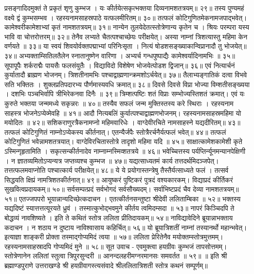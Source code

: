 प्रसङ्गादिदमुक्तं ते प्रकृतं शृणु कुम्भज ।
यः कीर्तयेत्सकृत्भक्तया दिव्यनामशतत्रयम्॥ २९॥
तस्य पुण्यमहं वक्ष्ये द्वं कुम्भसम्भव ।
रहस्यनामसाहस्रपाठे यत्फलमीरितम्॥ ३०॥
तत्फलं कोटिगुणितमेकनामजपाद्भवेत्।
कामेश्वरीकामेशाभ्यां कृतं नामशतत्रयम्॥ ३१॥
नान्येन तुलयेदेतत्स्तोत्रेणान्य कृतेन च ।
श्रियः परम्परा यस्य भावि वा चोत्तरोत्तरम्॥ ३२॥
तेनैव लभ्यते चैतत्पश्चाच्छेयः परीक्षयेत्।
अस्या नाम्नां त्रिशत्यास्तु महिमा केन वर्णयते ॥ ३३॥
या स्वयं शिवयोर्वक्तपद्माभ्यां परिनिःसृता ।
नित्यं षोडशसङ्ख्याकान्विप्रानादौ तु भोजयेत्॥ ३४॥
अभ्यक्ताम्सितिलतैलेन स्नातानुष्णेन वारिणा ।
अभ्यर्च गन्धपुष्पाद्यैः कामेश्वर्यादिनामभिः ॥ ३५॥
सूपापूपैः शर्कराद्मैः पायसैः फलसंयुतैः ।
विद्याविदो विशेषेण भोजयेत्पोडश द्विजान्॥ ३६॥
एवं नित्यार्चनं कुर्यातादौ ब्राह्मण भोजनम्।
त्रिशतीनामभिः पश्चाद्वाह्मणान्क्रमशोऽर्चयेत्॥ ३७॥
तैलाभ्यङ्गातिकं दत्वा विभवे सति भक्तितः ।
शुक्लप्रतिपदारभ्य पौर्णमास्यवधि क्रमात्॥ ३८॥
दिवसे दिवसे विप्रा भोज्या विम्शतीसङ्ख्यया ।
दशभिः पञ्चभिर्वापि त्रीभिरेकनवा दिनैः ॥ ३९॥
त्रिम्शत्पष्टिः शतं विप्राः सम्भोज्यस्तिशतं क्रमात्।
एवं यः कुरुते भक्तया जन्ममध्ये सकृन्नरः ॥ ४०॥
तस्यैव सफलं जन्म मुक्तिस्तस्य करे स्थिराः ।
रहस्यनाम साहस्त्र भोजनेऽप्येव्मेवहि ॥ ४१॥
आदौ नित्यबलिं कुर्यात्पश्चाद्वाह्मणभोजनम्।
रहस्यनामसाहस्रमहिमा यो मयोदितः ॥ ४२॥
सशिकराणुरत्रैकनामप्नो महिमवारिधेः ।
वाग्देवीरचिते नामसाहस्ने यद्यदीरितम्॥ ४३॥
तत्फलं कोटिगुणितं नाम्नोऽप्येकस्य कीर्तनात्।
एतन्यैर्जपैः स्तोत्रैरर्चनैर्यत्फलं भवेत्॥ ४४॥
तत्फलं कोटिगुणितं भवेन्नामशतत्रयात्।
वाग्देविरचितास्तोत्रे तादृशो महिमा यदि ॥ ४५॥
साक्षात्कामेशकामेशी कृते ऽस्मिन्गृहृतामिति ।
सकृत्सन्कीर्तनादेव नाम्नाम्नस्मिव्शतत्रये ॥ ४६॥
भवेच्चित्तस्य पर्यप्तिर्न्यूनमन्यानपेक्षिणी ।
न ज्ञातव्यमितोऽप्यन्यत्र जप्तव्यश्च कुम्भज ॥ ४७॥
यद्यत्साध्यतमं कार्य तत्तदर्थमिदञ्जपेत्।
तत्तत्फलमवाप्नोति पश्चात्कार्य परीक्षयेत्॥ ४८॥
ये ये प्रयोगास्तन्त्रेषु तैस्तैर्यत्साध्यते फलं ।
तत्सर्व सिद्धयति क्षिप्रं नामत्रिशतकीर्तनात्॥ ४९॥
आयुष्करं पुष्टिकरं पुत्रदं वश्यकारकम्।
विद्याप्रदं कीर्तिकरं सुखवित्वप्रदायकम्॥ ५०॥
सर्वसम्पत्प्रदं सर्वभोगदं सर्वसौख्यदम्।
सर्वाभिष्टप्रदं चैव देव्या नामशतत्रयम्॥ ५१॥
एतज्जपपरो भूयान्नान्यदिच्छेत्कदाचन ।
एतत्कीर्तनसन्तुष्टा श्रीदेवी ललिताम्बिका ॥ ५२॥
भक्तस्य यद्यदिष्टं स्यात्तत्तत्यूरयते ध्रुवं ।
तस्मात्कुभोद्भवमुने कीर्तय त्वमिदम्सदा ॥ ५३॥
नापरं किञ्चिदपि ते बोद्धव्यं नावशिष्यते ।
इति ते कथितं स्तोत्र ललिता प्रीतिदायकम्॥ ५४॥
नाविद्यावेदिने ब्रूयान्नाभक्ताय कदाचन ।
न शठाय न दुष्टाय नाविश्वासाय कहिर्चित्॥ ५६॥
यो ब्रूयात्रिशतीं नाम्नां तस्यानर्थो महान्भवेत्।
इत्याज्ञा शाङ्करी प्रोक्ता तस्माद्गोप्यमिदं त्वया ॥ ५७॥
ललिता प्रेरितेनैव मयोक्तम्स्तोत्रमुत्तमम्।
रहस्यनामसाहस्रादपि गोप्यमिदं मुने ॥ ५८॥
सूत उवाच -
एवमुक्त्वा हयग्रीवः कुम्भजं तापसोत्तमम्।
स्तोत्रेणानेन ललितां स्तुत्वा त्रिपुरसुन्दरी ॥
आनन्दलहरीमग्नरमानसः समवर्तत ॥ ५९॥
॥ इति श्री ब्रह्माण्डपुराणे उत्तराखण्डे
श्री हयग्रीवागस्त्यसंवादे
श्रीललितात्रिशती स्तोत्र कथनं सम्पूर्णम्॥
